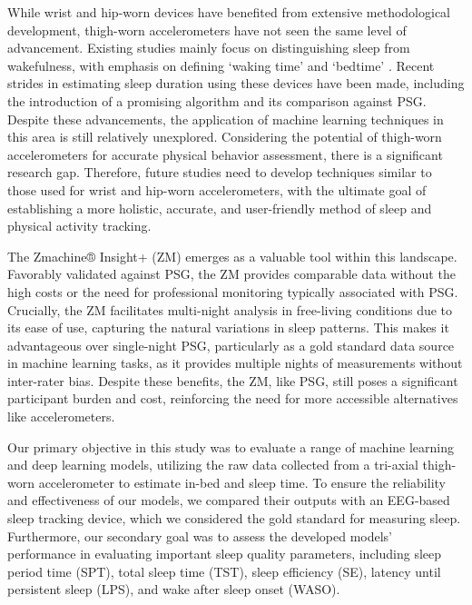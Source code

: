 \documentclass[
  super,
  preprint,
  3p]{elsarticle}
\begin{document}
While wrist and hip-worn devices have benefited from extensive
methodological development, thigh-worn accelerometers have not seen the
same level of advancement. Existing studies mainly focus on
distinguishing sleep from wakefulness, with emphasis on defining `waking
time' and `bedtime'
\citep{carlson2021, inan-eroglu2021, vanderberg2016, winkler2016}.
Recent strides in estimating sleep duration using these devices have
been made, including the introduction of a promising algorithm and its
comparison against PSG\citep{johansson_development_2023}. Despite these
advancements, the application of machine learning techniques in this
area is still relatively unexplored. Considering the potential of
thigh-worn accelerometers for accurate physical behavior
assessment\citep{skotte_detection_2014, arvidsson2019}, there is a
significant research gap. Therefore, future studies need to develop
techniques similar to those used for wrist and hip-worn accelerometers,
with the ultimate goal of establishing a more holistic, accurate, and
user-friendly method of sleep and physical activity tracking.

The Zmachine®️ Insight+ (ZM) emerges as a valuable tool within this
landscape. Favorably validated against PSG\citep{kaplan2014, wang2015},
the ZM provides comparable data without the high costs or the need for
professional monitoring typically associated with PSG. Crucially, the ZM
facilitates multi-night analysis in free-living conditions due to its
ease of use\citep{pedersen2021}, capturing the natural variations in
sleep patterns. This makes it advantageous over single-night PSG,
particularly as a gold standard data source in machine learning tasks,
as it provides multiple nights of measurements without inter-rater bias.
Despite these benefits, the ZM, like PSG, still poses a significant
participant burden and cost, reinforcing the need for more accessible
alternatives like accelerometers.

Our primary objective in this study was to evaluate a range of machine
learning and deep learning models, utilizing the raw data collected from
a tri-axial thigh-worn accelerometer to estimate in-bed and sleep time.
To ensure the reliability and effectiveness of our models, we compared
their outputs with an EEG-based sleep tracking device, which we
considered the gold standard for measuring sleep. Furthermore, our
secondary goal was to assess the developed models' performance in
evaluating important sleep quality parameters, including sleep period
time (SPT), total sleep time (TST), sleep efficiency (SE), latency until
persistent sleep (LPS), and wake after sleep onset (WASO).
\end{document}
